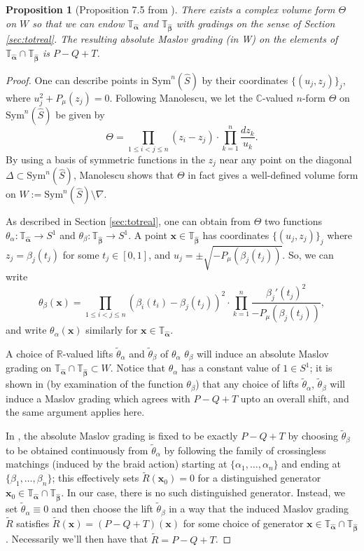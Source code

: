 \documentclass[11pt]{article}
\theoremstyle{plain} \newtheorem{thm}{Theorem}[subsection]
\theoremstyle{plain} \newtheorem{cor}[thm]{Corollary}
\theoremstyle{plain} \newtheorem{prop}[thm]{Proposition}
\theoremstyle{plain} \newtheorem{conj}[thm]{Conjecture}
\theoremstyle{plain} \newtheorem{lem}[thm]{Lemma}
\theoremstyle{definition} \newtheorem{df}[thm]{Definition}
\theoremstyle{remark} \newtheorem{rmk}[thm]{Remark}
\theoremstyle{remark} \newtheorem{obs}[thm]{Observation}
\newcommand{\tld}[1]{\widetilde{#1}}
\newcommand{\ba}{\boldsymbol{\alpha}}
\newcommand{\bb}{\boldsymbol{\beta}}
\newcommand{\bah}{\widehat{\ba}}
\newcommand{\bbh}{\widehat{\bb}}
\newcommand{\Tah}{\mathbb{T}_{\bah}}
\newcommand{\Tbh}{\mathbb{T}_{\bbh}}
\newcommand{\bx}{\mathbf{x}}
\newcommand{\tbt}{\tld{\theta}_{\beta}}
\newcommand{\tat}{\tld{\theta}_{\alpha}}
\newcommand{\ta}{\theta_{\alpha}}
\newcommand{\tb}{\theta_{\beta}}
\begin{document}
\begin{prop}[Proposition 7.5 from \cite{cm:R}]\label{prop:cmR}
There exists a complex volume form $\Theta$ on $W$ so that we can endow $\Tah$ and $\Tbh$ with gradings on the sense of Section \ref{sec:totreal}.  The resulting absolute Maslov grading (in W) on the elements of $\Tah \cap \Tbh$ is $ P - Q + T$.
\end{prop}

\begin{proof}
One can describe points in $\text{Sym}^n(\widehat{S})$ by their coordinates $\{ (u_j,z_j) \}_{j}$, where $u_j^2 + P_{\mu}(z_j) = 0$.  Following Manolescu, we let the $\mathbb{C}$-valued $n$-form $\Theta$ on $\text{Sym}^n(\widehat{S})$ be given by
$$ \Theta = \prod_{1 \leq i < j \leq n} \left( z_i - z_j \right)\cdot  \prod_{k = 1}^n \frac{dz_k}{u_k}.$$
By using a basis of symmetric functions in the $z_j$ near any point on the diagonal $\Delta \subset \text{Sym}^n(\widehat{S})$, Manolescu shows that $\Theta$ in fact gives a well-defined volume form on $W:=\text{Sym}^n(\widehat{S}) \setminus \nabla$.

As described in Section \ref{sec:totreal}, one can obtain from $\Theta$ two functions $\theta_{\alpha}:\Tah \rightarrow S^1$ and $\theta_{\beta}:\Tbh \rightarrow S^1$.  A point $\bx \in \Tbh$ has coordinates $\{ (u_j, z_j)\}_j$ where $z_j = \beta_j (t_j)$ for some $t_j \in [0,1]$, and $u_j = \pm \sqrt{-P_{\mu}(\beta_j(t_j))}$.  So, we can write
$$ \theta_{\beta}(\bx) = \prod_{1 \leq i < j \leq n} \left( \beta_i(t_i) - \beta_j(t_j) \right)^2\cdot  \prod_{k = 1}^n \frac{\beta_j'(t_j)^2}{-P_{\mu}(\beta_j(t_j))},$$
and write $\theta_{\alpha}(\bx)$ similarly for $\bx \in \Tah$.

A choice of $\mathbb{R}$-valued lifts $\tat$ and $\tbt$ of $\ta$ $\tb$ will induce an absolute Maslov grading on $\Tah \cap \Tbh \subset W$.  Notice that $\ta$ has a constant value of $1 \in S^1$; it is shown in \cite{cm:R} (by examination of the function $\tb$) that any choice of lifts $\tat$, $\tbt$ will induce a Maslov grading which agrees with $P-Q+T$ upto an overall shift, and the same argument applies here.

In \cite{cm:R}, the absolute Maslov grading is fixed to be exactly $P - Q + T$ by choosing $\tbt$ to be obtained continuously from $\tat$ by following the family of crossingless matchings (induced by the braid action) starting at $\{ \alpha_1, \ldots, \alpha_n \}$ and ending at $\{ \beta_1, \ldots, \beta_n \}$; this effectively sets $\tld{R}(\bx_0) = 0$ for a distinguished generator $\bx_0 \in \Tah \cap \Tbh$.  In our case, there is no such distinguished generator.  Instead, we set $\tat \equiv 0$ and then choose the lift $\tbt$ in a way that the induced Maslov grading $\tld{R}$ satisfies $\tld{R}(\bx) = (P - Q + T)(\bx)$ for some choice of generator $\bx \in \Tah \cap \Tbh$.  Necessarily we'll then have that $\tld{R} = P - Q + T$.


\end{proof}
\end{document}
